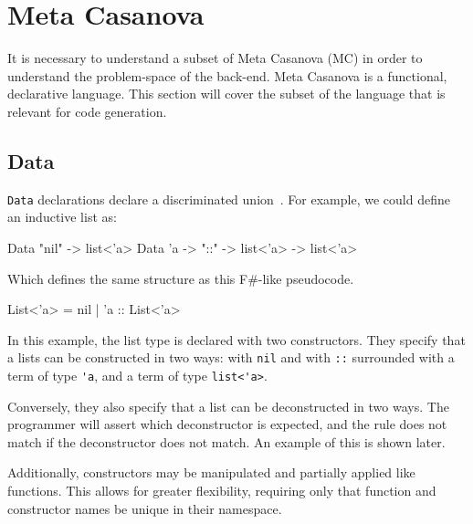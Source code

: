 \section{Meta Casanova}\label{metacasanova}
It is necessary to understand a subset of Meta Casanova (MC) in order to understand the problem-space of the back-end.
Meta Casanova is a functional, declarative language.
This section will cover the subset of the language that is relevant for code generation.

\subsection{Data}\label{mcdata}
\texttt{Data} declarations declare a discriminated union~\cite{guttag}.
For example, we could define an inductive list as:

\begin{MC}
Data "nil" -> list<'a>
Data 'a -> "::" -> list<'a> -> list<'a>
\end{MC}

Which defines the same structure as this F\#-like pseudocode.

\begin{FS}
List<'a> = nil 
         | 'a :: List<'a>
\end{FS}

In this example, the list type is declared with two constructors.
They specify that a lists can be constructed in two ways: with \verb|nil| and with \verb|::| surrounded with a term of type \verb|'a|, and a term of type \verb|list<'a>|.

Conversely, they also specify that a list can be deconstructed in two ways.
The programmer will assert which deconstructor is expected, and the rule does not match if the deconstructor does not match.
An example of this is shown later.

Additionally, constructors may be manipulated and partially applied like functions.
This allows for greater flexibility, requiring only that function and constructor names be unique in their namespace.

%
%

